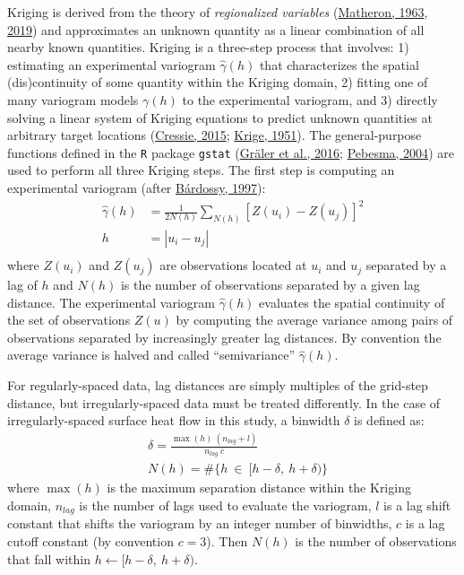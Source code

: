 Kriging is derived from the theory of \emph{regionalized variables} (\protect\hyperlink{ref-matheron1963}{Matheron, 1963}, \protect\hyperlink{ref-matheron2019}{2019}) and approximates an unknown quantity as a linear combination of all nearby known quantities. Kriging is a three-step process that involves: 1) estimating an experimental variogram \(\hat{\gamma}(h)\) that characterizes the spatial (dis)continuity of some quantity within the Kriging domain, 2) fitting one of many variogram models \(\gamma(h)\) to the experimental variogram, and 3) directly solving a linear system of Kriging equations to predict unknown quantities at arbitrary target locations (\protect\hyperlink{ref-cressie2015}{Cressie, 2015}; \protect\hyperlink{ref-krige1951}{Krige, 1951}). The general-purpose functions defined in the \texttt{R} package \texttt{gstat} (\protect\hyperlink{ref-graler2016}{Gräler et al., 2016}; \protect\hyperlink{ref-pebesma2004}{Pebesma, 2004}) are used to perform all three Kriging steps. The first step is computing an experimental variogram (after \protect\hyperlink{ref-bardossy1997}{Bárdossy, 1997}):
\begin{equation}
  \begin{aligned}
    \hat{\gamma}(h) &= \frac{1}{2N(h)}\sum_{N(h)}^{}[Z(u_i) - Z(u_j)]^2 \\
    h &= |u_i - u_j| \\
  \end{aligned}
  \label{eq:variogram}
\end{equation}
where \(Z(u_i)\) and \(Z(u_j)\) are observations located at \(u_i\) and \(u_j\) separated by a lag of \(h\) and \(N(h)\) is the number of observations separated by a given lag distance. The experimental variogram \(\hat{\gamma}(h)\) evaluates the spatial continuity of the set of observations \(Z(u)\) by computing the average variance among pairs of observations separated by increasingly greater lag distances. By convention the average variance is halved and called ``semivariance'' \(\hat{\gamma}(h)\).

For regularly-spaced data, lag distances are simply multiples of the grid-step distance, but irregularly-spaced data must be treated differently. In the case of irregularly-spaced surface heat flow in this study, a binwidth \(\delta\) is defined as:
\begin{equation}
  \begin{aligned}
    &\delta = \frac{\max(h)\ (n_{lag}+l)}{n_{lag}\ c} \\
    &N(h) = \#\{h \  \in \  [h - \delta,\  h + \delta)\}
  \end{aligned}
  \label{eq:binwidth}
\end{equation}
where \(\max(h)\) is the maximum separation distance within the Kriging domain, \(n_{lag}\) is the number of lags used to evaluate the variogram, \(l\) is a lag shift constant that shifts the variogram by an integer number of binwidths, \(c\) is a lag cutoff constant (by convention \(c=3\)). Then \(N(h)\) is the number of observations that fall within \(h \leftarrow [h-\delta,\ h+\delta)\).

